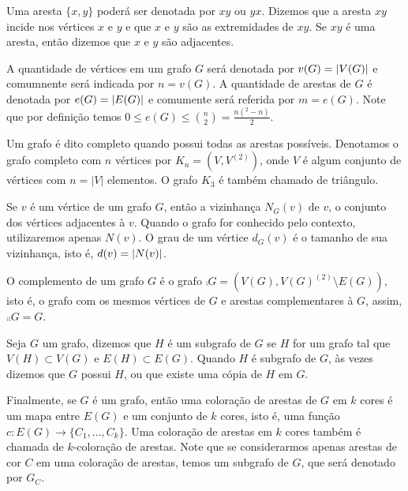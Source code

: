 Uma aresta $\{ x,y\}$ poderá ser denotada por $xy$ ou $yx$. Dizemos que a aresta $xy$ incide nos vértices $x$ e $y$ e que $x$ e $y$ são as extremidades de $xy$.
Se $xy$ é uma aresta, então dizemos que $x$ e $y$ são adjacentes.


A quantidade de vértices em um grafo $G$ será denotada por $v(G) = \left | V(G) \right |$ e comumnente será indicada por $n = v(G)$. A quantidade de arestas de $G$ é denotada por $e(G) = \left | E(G) \right |$ e comumente será referida por $m = e(G)$. Note que por definição temos $0 \leq e(G) \leq \binom{n}{2} = \frac{n(^2 - n)}{2}$.

\begin{example}
Um grafo é dito completo quando possui todas as arestas possíveis. Denotamos o grafo completo com $n$ vértices por $K_n = (V,V^{(2)})$, onde $V$ é algum conjunto de vértices com $n = |V|$ elementos. O grafo $K_3$ é também chamado de triângulo.

\end{example}

Se $v$ é um vértice de um grafo $G$, então a vizinhança $N_G(v)$ de $v$, o conjunto dos vértices adjacentes à $v$. Quando o grafo for conhecido pelo contexto, utilizaremos apenas $N(v)$. O grau de um vértice $d_G(v)$ é o tamanho de sua vizinhança, isto é, $d(v) = \left | N(v) \right |$.

O complemento de um grafo $G$ é o grafo $\comp{G} = (V(G), V(G)^{(2)} \setminus E(G))$, isto é, o grafo com os mesmos vértices de $G$ e arestas complementares à $G$, assim, $\comp{\comp{G}} = G$.

Seja $G$ um grafo, dizemos que $H$ é um subgrafo de $G$ se $H$ for um grafo tal que $V(H) \subset V(G)$ e $E(H) \subset E(G)$. Quando $H$ é subgrafo de $G$, às vezes dizemos que $G$ possui $H$, ou que existe uma cópia de $H$ em $G$.

Finalmente, se $G$ é um grafo, então uma coloração de arestas de $G$ em $k$ cores é um mapa entre $E(G)$ e um conjunto de $k$ cores, isto é, uma função $c: E(G) \to \{ C_1, \dots, C_k\}$. Uma coloração de arestas em $k$ cores também é chamada de $k$-coloração de arestas. Note que se considerarmos apenas arestas de cor $C$ em uma coloração de arestas, temos um subgrafo de $G$, que será denotado por $G_C$.


